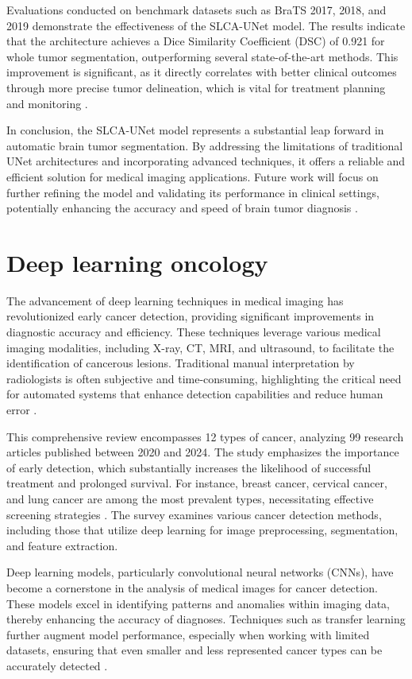 \documentclass[runningheads]{llncs}
\begin{document}
Evaluations conducted on benchmark datasets such as BraTS 2017, 2018, and 2019 demonstrate the effectiveness of the SLCA-UNet model. The results indicate that the architecture achieves a Dice Similarity Coefficient (DSC) of 0.921 for whole tumor segmentation, outperforming several state-of-the-art methods. This improvement is significant, as it directly correlates with better clinical outcomes through more precise tumor delineation, which is vital for treatment planning and monitoring \cite{P.S._2025}.

In conclusion, the SLCA-UNet model represents a substantial leap forward in automatic brain tumor segmentation. By addressing the limitations of traditional UNet architectures and incorporating advanced techniques, it offers a reliable and efficient solution for medical imaging applications. Future work will focus on further refining the model and validating its performance in clinical settings, potentially enhancing the accuracy and speed of brain tumor diagnosis \cite{P.S._2025}.
\section{Deep learning oncology}
The advancement of deep learning techniques in medical imaging has revolutionized early cancer detection, providing significant improvements in diagnostic accuracy and efficiency. These techniques leverage various medical imaging modalities, including X-ray, CT, MRI, and ultrasound, to facilitate the identification of cancerous lesions. Traditional manual interpretation by radiologists is often subjective and time-consuming, highlighting the critical need for automated systems that enhance detection capabilities and reduce human error \cite{Istiak_2024}. 

This comprehensive review encompasses 12 types of cancer, analyzing 99 research articles published between 2020 and 2024. The study emphasizes the importance of early detection, which substantially increases the likelihood of successful treatment and prolonged survival. For instance, breast cancer, cervical cancer, and lung cancer are among the most prevalent types, necessitating effective screening strategies \cite{Istiak_2024}. The survey examines various cancer detection methods, including those that utilize deep learning for image preprocessing, segmentation, and feature extraction. 

Deep learning models, particularly convolutional neural networks (CNNs), have become a cornerstone in the analysis of medical images for cancer detection. These models excel in identifying patterns and anomalies within imaging data, thereby enhancing the accuracy of diagnoses. Techniques such as transfer learning further augment model performance, especially when working with limited datasets, ensuring that even smaller and less represented cancer types can be accurately detected \cite{Istiak_2024}. 
\end{document}
